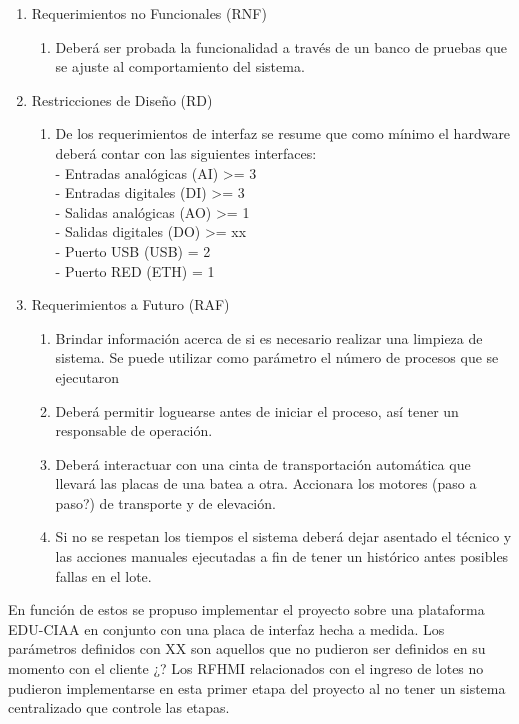 \begin{enumerate}
\begin{enumerate}
\end{enumerate}

\item Requerimientos no Funcionales (RNF)
\begin{enumerate}
\item Deberá ser probada la funcionalidad a través de un banco de pruebas que se ajuste al comportamiento del sistema. 
\end{enumerate}
\item Restricciones de Diseño (RD)
\begin{enumerate}
\item De los requerimientos de interfaz se resume que como mínimo el hardware deberá contar con las siguientes interfaces:\\
- Entradas analógicas (AI) >= 3	\\
- Entradas digitales (DI) >= 3	\\
- Salidas analógicas (AO) >= 1	\\
- Salidas digitales (DO) >= xx	\\
- Puerto USB (USB) = 2	\\
- Puerto RED (ETH) = 1	\\
\end{enumerate}
\item Requerimientos a Futuro (RAF)
\begin{enumerate}
\item Brindar información acerca de si es necesario realizar una limpieza de sistema. Se puede utilizar como parámetro el número de procesos que se ejecutaron 	 	 	
\item Deberá permitir loguearse antes de iniciar el proceso, así tener un responsable de operación.
\item Deberá interactuar con una cinta de transportación automática que llevará las placas de una batea a otra. Accionara los motores (paso a paso?) de transporte y de elevación.
\item Si no se respetan los tiempos el sistema deberá dejar asentado el técnico y las acciones manuales ejecutadas a fin de tener un histórico antes posibles fallas en el lote.
\end{enumerate}

\end{enumerate}

En función de estos se propuso implementar el proyecto sobre una plataforma EDU-CIAA \citep{CIAA} en conjunto con una placa de interfaz hecha a medida. 
Los parámetros definidos con XX son aquellos que no pudieron ser definidos en su momento con el cliente ¿?
Los RFHMI relacionados con el ingreso de lotes no pudieron implementarse en esta primer etapa del proyecto al no tener un sistema centralizado que controle las etapas.







